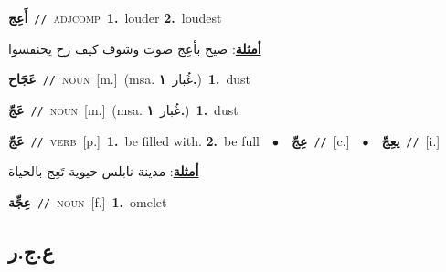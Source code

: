 \documentclass[10pt,a4paper,twoside]{article} %
\begin{document}
\begin{multicols}{2}
{\setlength\topsep{0pt}\textbf{\foreignlanguage{arabic}{أَعِج}}\ {\color{gray}\texttt{//}\color{black}}\ \textsc{adj\textunderscore comp}\ \textbf{1.}~louder  \textbf{2.}~loudest\  \begin{flushright}\color{gray}\foreignlanguage{arabic}{\textbf{\underline{\foreignlanguage{arabic}{أمثلة}}}: صيح بأعِج صوت وشوف كيف رح يخنفسوا}\end{flushright}\color{black}} \vspace{2mm}

{\setlength\topsep{0pt}\textbf{\foreignlanguage{arabic}{عَجَاح}}\ {\color{gray}\texttt{//}\color{black}}\ \textsc{noun}\ [m.]\ \color{gray}(msa. \foreignlanguage{arabic}{غُبار}~\foreignlanguage{arabic}{\textbf{١.}})\color{black}\ \textbf{1.}~dust\ } \vspace{2mm}

{\setlength\topsep{0pt}\textbf{\foreignlanguage{arabic}{عَجّ}}\ {\color{gray}\texttt{//}\color{black}}\ \textsc{noun}\ [m.]\ \color{gray}(msa. \foreignlanguage{arabic}{غُبار}~\foreignlanguage{arabic}{\textbf{١.}})\color{black}\ \textbf{1.}~dust\ } \vspace{2mm}

{\setlength\topsep{0pt}\textbf{\foreignlanguage{arabic}{عَجّ}}\ {\color{gray}\texttt{//}\color{black}}\ \textsc{verb}\ [p.]\ \textbf{1.}~be filled with.  \textbf{2.}~be full\ \ $\bullet$\ \ \setlength\topsep{0pt}\textbf{\foreignlanguage{arabic}{عِجّ}}\ {\color{gray}\texttt{//}\color{black}}\ [c.]\ \ $\bullet$\ \ \setlength\topsep{0pt}\textbf{\foreignlanguage{arabic}{يعِجّ}}\ {\color{gray}\texttt{//}\color{black}}\ [i.]\  \begin{flushright}\color{gray}\foreignlanguage{arabic}{\textbf{\underline{\foreignlanguage{arabic}{أمثلة}}}: مدينة نابلس حيوية تَعِج بالحياة}\end{flushright}\color{black}} \vspace{2mm}

{\setlength\topsep{0pt}\textbf{\foreignlanguage{arabic}{عِجِّة}}\ {\color{gray}\texttt{//}\color{black}}\ \textsc{noun}\ [f.]\ \textbf{1.}~omelet\ } \vspace{2mm}

\vspace{-3mm}
\subsection*{\color{blue}\foreignlanguage{arabic}{ع.ج.ر}\color{blue}{}} 


\end{multicols}
\end{document}
